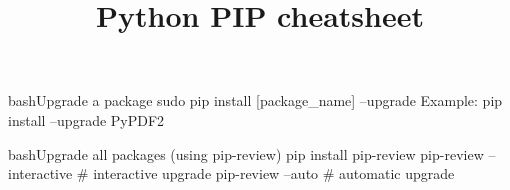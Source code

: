 \documentclass[10pt,a4paper]{article}
\title{\color{w3schools}Python PIP cheatsheet
}
\begin{document}
\maketitle
\small
\begin{multicols}{3}

\thispagestyle{empty}
\scriptsize

% 




\begin{codebox}{bash}{Upgrade a package}
sudo pip install [package_name] --upgrade
Example: pip install --upgrade PyPDF2

\end{codebox}

\begin{codebox}{bash}{Upgrade all packages (using pip-review)}
pip install pip-review
pip-review --interactive # interactive upgrade
pip-review  --auto       # automatic upgrade

\end{codebox}


\AtNextBibliography{\footnotesize}
\printbibliography  
\end{multicols}
\end{document}
